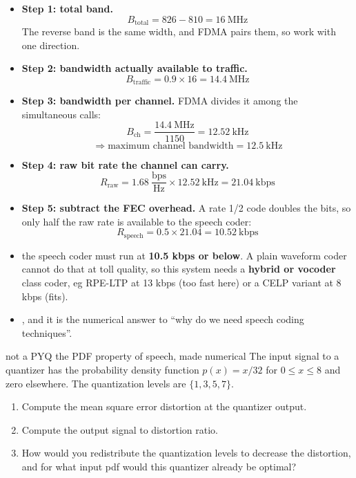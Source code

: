 \begin{itemize}
  \item \textbf{Step 1: total band.}
        \[ B_{\text{total}} = 826 - 810 = 16\ \text{MHz} \]
        {\color{sub}\footnotesize The reverse band is the same width, and FDMA pairs them, so work
        with one direction.}
  \item \textbf{Step 2: bandwidth actually available to traffic.}
        \[ B_{\text{traffic}} = 0.9 \times 16 = 14.4\ \text{MHz} \]
  \item \textbf{Step 3: bandwidth per channel.} FDMA divides it among the simultaneous calls:
        \[ B_{\text{ch}} = \frac{14.4\ \text{MHz}}{1150} = 12.52\ \text{kHz} \]
        \[ \Rightarrow \boxed{\text{maximum channel bandwidth} = 12.5\ \text{kHz}} \]
  \item \textbf{Step 4: raw bit rate the channel can carry.}
        \[ R_{\text{raw}} = 1.68\ \frac{\text{bps}}{\text{Hz}} \times 12.52\ \text{kHz}
                          = 21.04\ \text{kbps} \]
  \item \textbf{Step 5: subtract the FEC overhead.} A rate 1/2 code doubles the bits, so only half
        the raw rate is available to the speech coder:
        \[ R_{\text{speech}} = 0.5 \times 21.04 = \boxed{10.52\ \text{kbps}} \]
  \item {} the speech coder must run at \textbf{10.5 kbps or below}. A plain
        waveform coder cannot do that at toll quality, so this system needs a
        \textbf{hybrid or vocoder} class coder, eg RPE-LTP at 13 kbps (too fast here) or a CELP
        variant at 8 kbps (fits).
  \item {},
        and it is the numerical answer to ``why do we need speech coding techniques''.
\end{itemize}

\hr

{\color{sub}\footnotesize {}}

\begin{asked}[PROBLEM]{not a PYQ \textperiodcentered{} the PDF property of speech, made numerical \added}
The input signal to a quantizer has the probability density function $p(x) = x/32$ for
$0 \le x \le 8$ and zero elsewhere. The quantization levels are $\{1, 3, 5, 7\}$.
\begin{enumerate}[label=\alph*), leftmargin=1.6em]
  \item Compute the mean square error distortion at the quantizer output.
  \item Compute the output signal to distortion ratio.
  \item How would you redistribute the quantization levels to decrease the distortion, and for
        what input pdf would this quantizer already be optimal?
\end{enumerate}
\end{asked}

